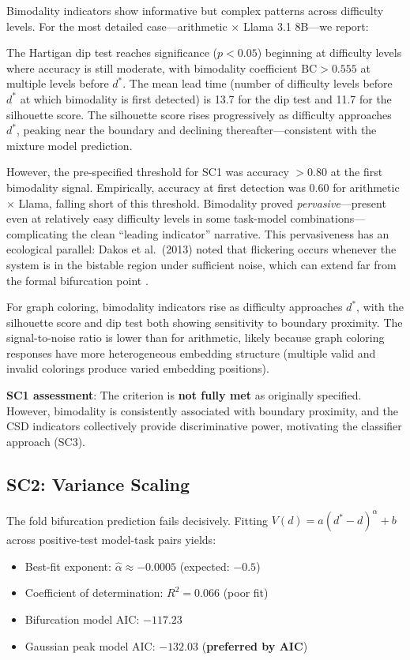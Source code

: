 \documentclass[11pt,letterpaper]{article}
\begin{document}
Bimodality indicators show informative but complex patterns across difficulty levels. For the most detailed case---arithmetic $\times$ Llama 3.1 8B---we report:

The Hartigan dip test reaches significance ($p < 0.05$) beginning at difficulty levels where accuracy is still moderate, with bimodality coefficient $\text{BC} > 0.555$ at multiple levels before $d^*$. The mean lead time (number of difficulty levels before $d^*$ at which bimodality is first detected) is 13.7 for the dip test and 11.7 for the silhouette score. The silhouette score rises progressively as difficulty approaches $d^*$, peaking near the boundary and declining thereafter---consistent with the mixture model prediction.

However, the pre-specified threshold for SC1 was accuracy $> 0.80$ at the first bimodality signal. Empirically, accuracy at first detection was 0.60 for arithmetic $\times$ Llama, falling short of this threshold. Bimodality proved \emph{pervasive}---present even at relatively easy difficulty levels in some task-model combinations---complicating the clean ``leading indicator'' narrative. This pervasiveness has an ecological parallel: Dakos et al.~(2013) noted that flickering occurs whenever the system is in the bistable region under sufficient noise, which can extend far from the formal bifurcation point \cite{dakos2013}.

For graph coloring, bimodality indicators rise as difficulty approaches $d^*$, with the silhouette score and dip test both showing sensitivity to boundary proximity. The signal-to-noise ratio is lower than for arithmetic, likely because graph coloring responses have more heterogeneous embedding structure (multiple valid and invalid colorings produce varied embedding positions).

\textbf{SC1 assessment}: The criterion is \textbf{not fully met} as originally specified. However, bimodality is consistently associated with boundary proximity, and the CSD indicators collectively provide discriminative power, motivating the classifier approach (SC3).

\subsection{SC2: Variance Scaling}

The fold bifurcation prediction fails decisively. Fitting $V(d) = a(d^* - d)^{\alpha} + b$ across positive-test model-task pairs yields:
\begin{itemize}
    \item Best-fit exponent: $\hat{\alpha} \approx -0.0005$ (expected: $-0.5$)
    \item Coefficient of determination: $R^2 = 0.066$ (poor fit)
    \item Bifurcation model AIC: $-117.23$
    \item Gaussian peak model AIC: $-132.03$ (\textbf{preferred by AIC})
\end{itemize}
\end{document}
